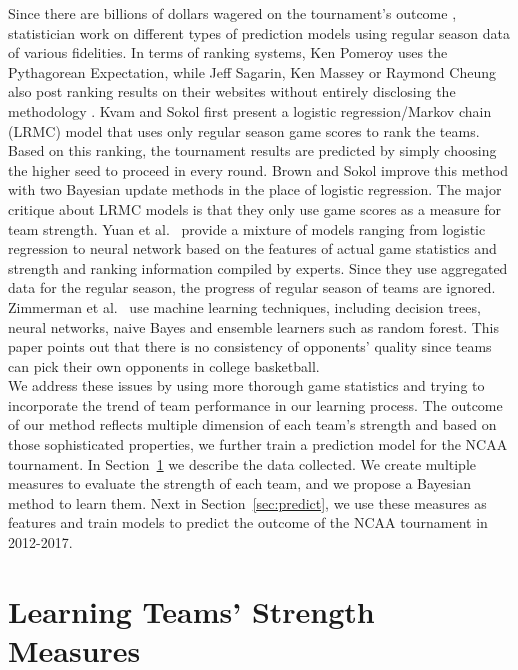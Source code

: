 \documentclass[11pt]{article}
\begin{document}
	Since there are billions of dollars wagered on the tournament's outcome \cite{matuszewski2011bet}, statistician work on different types of prediction models using regular season data of various fidelities. In terms of ranking systems, Ken Pomeroy uses the Pythagorean Expectation, while Jeff Sagarin, Ken Massey or Raymond Cheung also post ranking results on their websites without entirely disclosing the methodology \cite{masseyRating,sagarinRating}. Kvam and Sokol \cite{kvam2006logistic} first present a logistic regression/Markov chain (LRMC) model that uses only regular season game scores to rank the teams. Based on this ranking, the tournament results are predicted by simply choosing the higher seed to proceed in every round. Brown and Sokol \cite{brown2010improved} improve this method with two Bayesian update methods in the place of logistic regression. The major critique about LRMC models is that they only use game scores as a measure for team strength. Yuan et al.~\cite{yuan2015mixture} provide a mixture of models ranging from logistic regression to neural network based on the features of actual game statistics and strength and ranking information compiled by experts. Since they use aggregated data for the regular season, the progress of regular season of teams are ignored. Zimmerman et al.~\cite{zimmermann2013predicting} use machine learning techniques, including decision trees, neural networks, naive Bayes and ensemble learners such as random forest. This paper points out that there is no consistency of opponents' quality since teams can pick their own opponents in college basketball. \\
	\newline
	We address these issues by using more thorough game statistics and trying to incorporate the trend of team performance in our learning process. The outcome of our method reflects multiple dimension of each team's strength and based on those sophisticated properties, we further train a prediction model for the NCAA tournament. In Section~\ref{sec:learn} we describe the data collected. We create multiple measures to evaluate the strength of each team, and we propose a Bayesian method to learn them. Next in Section~\ref{sec:predict}, we use these measures as features and train models to predict the outcome of the NCAA tournament in 2012-2017. 
	
\section{Learning Teams' Strength Measures} \label{sec:learn}
	
\end{document}
